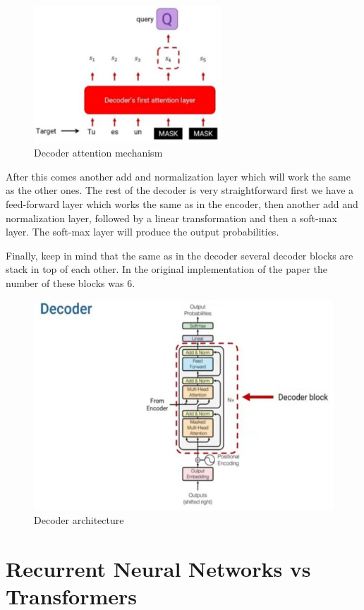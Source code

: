 \begin{figure}[h]
    \centering
    \includegraphics[width=7cm]{Images/decoder-attention.jpg}
    \caption{Decoder attention mechanism}
\end{figure}

\noindent After this comes another add and normalization layer which will work the same as the other ones. The rest of the decoder is very straightforward first we have a feed-forward layer which works the same as in the encoder, then another add and normalization layer, followed by a linear transformation and then a soft-max layer. The soft-max layer will produce the output probabilities.

\newpage
\noindent Finally, keep in mind that the same as in the decoder several decoder blocks are stack in top of each other. In the original implementation of the paper the number of these blocks was 6.

\begin{figure}[h]
    \centering
    \includegraphics[width=12cm]{Images/decoder.jpg}
    \caption{Decoder architecture}
\end{figure}

\section{Recurrent Neural Networks vs Transformers}

